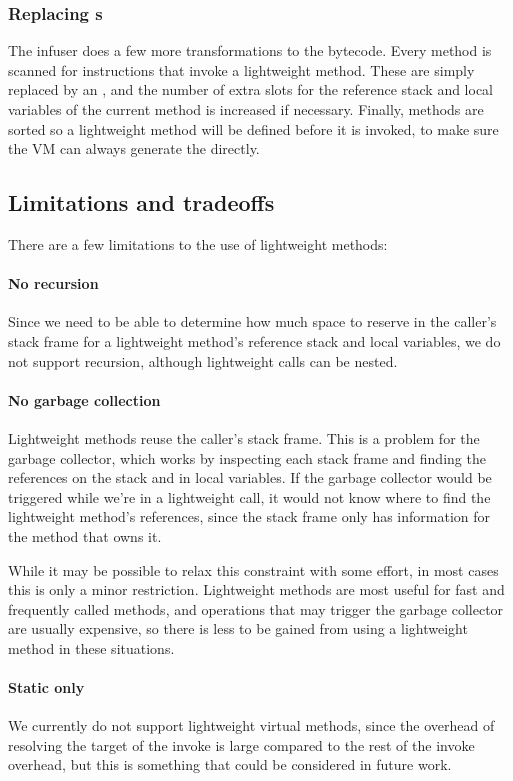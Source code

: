 \subsubsection{Replacing s}
The infuser does a few more transformations to the bytecode. Every method is scanned for  instructions that invoke a lightweight method. These are simply replaced by an , and the number of extra slots for the reference stack and local variables of the current method is increased if necessary. Finally, methods are sorted so a lightweight method will be defined before it is invoked, to make sure the VM can always generate the  directly.


\subsection{Limitations and tradeoffs}
There are a few limitations to the use of lightweight methods:
\paragraph{No recursion} Since we need to be able to determine how much space to reserve in the caller's stack frame for a lightweight method's reference stack and local variables, we do not support recursion, although lightweight calls can be nested.

\paragraph{No garbage collection}
Lightweight methods reuse the caller's stack frame. This is a problem for the garbage collector, which works by inspecting each stack frame and finding the references on the stack and in local variables. If the garbage collector would be triggered while we're in a lightweight call, it would not know where to find the lightweight method's references, since the stack frame only has information for the method that owns it.

While it may be possible to relax this constraint with some effort, in most cases this is only a minor restriction. Lightweight methods are most useful for fast and frequently called methods, and operations that may trigger the garbage collector are usually expensive, so there is less to be gained from using a lightweight method in these situations.

\paragraph{Static only}
We currently do not support lightweight virtual methods, since the overhead of resolving the target of the invoke is large compared to the rest of the invoke overhead, but this is something that could be considered in future work.


